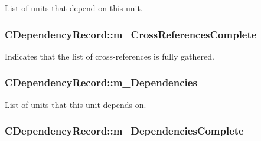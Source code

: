 List of units that depend on this unit. 

\hypertarget{classCDependencyRecord_a831a0a5935519f39e1c100fd8a65224f}{
\subsubsection[{m\-\_\-\-Cross\-References\-Complete}]{\setlength{\rightskip}{0pt plus 5cm}C\-Dependency\-Record\-::m\-\_\-\-Cross\-References\-Complete\hspace{0.3cm}{\ttfamily [private]}}}\label{classCDependencyRecord_a831a0a5935519f39e1c100fd8a65224f}


Indicates that the list of cross-\/references is fully gathered. 

\hypertarget{classCDependencyRecord_a169a19e632aa59249d667ef45e2b2560}{
\subsubsection[{m\-\_\-\-Dependencies}]{\setlength{\rightskip}{0pt plus 5cm}C\-Dependency\-Record\-::m\-\_\-\-Dependencies\hspace{0.3cm}{\ttfamily [private]}}}\label{classCDependencyRecord_a169a19e632aa59249d667ef45e2b2560}


List of units that this unit depends on. 

\hypertarget{classCDependencyRecord_af5ddb7b517658fd95a80c04d94f555dd}{
\subsubsection[{m\-\_\-\-Dependencies\-Complete}]{\setlength{\rightskip}{0pt plus 5cm}C\-Dependency\-Record\-::m\-\_\-\-Dependencies\-Complete\hspace{0.3cm}{\ttfamily [private]}}}\label{classCDependencyRecord_af5ddb7b517658fd95a80c04d94f555dd}


